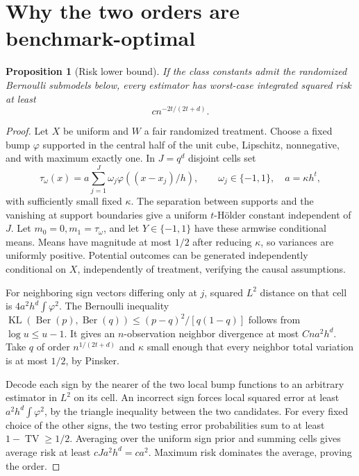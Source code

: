 \documentclass[11pt]{article}
\newtheorem{proposition}[theorem]{Proposition}
\theoremstyle{remark}
\newcommand{\TV}{\operatorname{TV}}
\newcommand{\KL}{\operatorname{KL}}
\begin{document}
\section{Why the two orders are benchmark-optimal}
\begin{proposition}[Risk lower bound]\label{risklower}
If the class constants admit the randomized Bernoulli submodels below, every estimator has worst-case integrated squared risk at least
\[c n^{-2t/(2t+d)}.\]
\end{proposition}
\begin{proof}
Let $X$ be uniform and $W$ a fair randomized treatment. Choose a fixed bump $\varphi$ supported in the central half of the unit cube, Lipschitz, nonnegative, and with maximum exactly one. In $J=q^d$ disjoint cells set
\[
 \tau_\omega(x)=a\sum_{j=1}^J\omega_j\varphi((x-x_j)/h),
 \qquad \omega_j\in\{-1,1\},\quad a=\kappa h^t,
\]
with sufficiently small fixed $\kappa$. The separation between supports and the vanishing at support boundaries give a uniform $t$-H\"older constant independent of $J$. Let $m_0=0,m_1=\tau_\omega$, and let $Y\in\{-1,1\}$ have these armwise conditional means. Means have magnitude at most $1/2$ after reducing $\kappa$, so variances are uniformly positive. Potential outcomes can be generated independently conditional on $X$, independently of treatment, verifying the causal assumptions.

For neighboring sign vectors differing only at $j$, squared $L^2$ distance on that cell is $4a^2h^d\int\varphi^2$. The Bernoulli inequality
$\KL(\operatorname{Ber}(p),\operatorname{Ber}(q))\leq(p-q)^2/[q(1-q)]$ follows from $\log u\leq u-1$. It gives an $n$-observation neighbor divergence at most $Cna^2h^d$. Take $q$ of order $n^{1/(2t+d)}$ and $\kappa$ small enough that every neighbor total variation is at most $1/2$, by Pinsker.

Decode each sign by the nearer of the two local bump functions to an arbitrary estimator in $L^2$ on its cell. An incorrect sign forces local squared error at least $a^2h^d\int\varphi^2$, by the triangle inequality between the two candidates. For every fixed choice of the other signs, the two testing error probabilities sum to at least $1-\TV\geq1/2$. Averaging over the uniform sign prior and summing cells gives average risk at least $cJa^2h^d=ca^2$. Maximum risk dominates the average, proving the order.
\end{proof}
\end{document}
